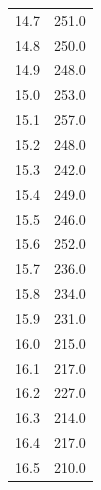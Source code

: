 \begin{table}
\begin{tabular}[t]{cc}
  14.7 & 251.0  \\
  14.8 & 250.0  \\
  14.9 & 248.0  \\
  15.0 & 253.0  \\
  15.1 & 257.0  \\
  15.2 & 248.0  \\
  15.3 & 242.0  \\
  15.4 & 249.0  \\
  15.5 & 246.0  \\
  15.6 & 252.0  \\
  15.7 & 236.0  \\
  15.8 & 234.0  \\
  15.9 & 231.0  \\
  16.0 & 215.0  \\
  16.1 & 217.0  \\
  16.2 & 227.0  \\
  16.3 & 214.0  \\
  16.4 & 217.0  \\
  16.5 & 210.0  \\
  \bottomrule
  \end{tabular}
  \label{tab:emission1}
\end{table}

